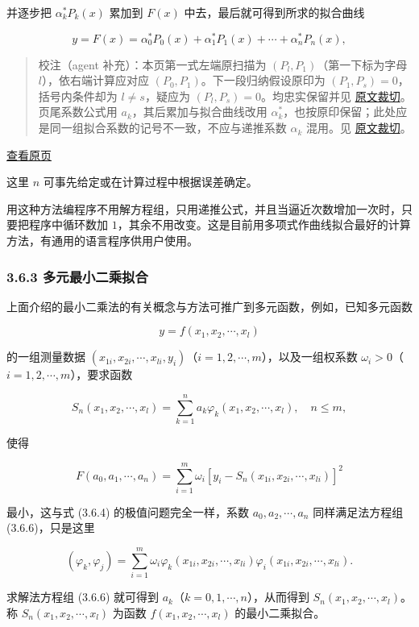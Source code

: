 \documentclass[
  10pt,
  fontset=fandol]{ctexart}
\begin{document}
并逐步把 \(\alpha_k^*P_k(x)\) 累加到 \(F(x)\) 中去，最后就可得到所求的拟合曲线

\[
y=F(x)=\alpha_0^*P_0(x)+\alpha_1^*P_1(x)+\cdots+\alpha_n^*P_n(x),
\]

\begin{quote}
校注（agent 补充）：本页第一式左端原扫描为 \((P_l,P_1)\)（第一下标为字母 \(l\)），依右端计算应对应 \((P_0,P_1)\)。下一段归纳假设原印为 \((P_1,P_s)=0\)，括号内条件却为 \(l\ne s\)，疑应为 \((P_l,P_s)=0\)。均忠实保留并见 \href{../assets/ch03b/p083-induction-start.png}{原文裁切}。页尾系数公式用 \(a_k\)，其后累加与拟合曲线改用 \(\alpha_k^*\)，也按原印保留；此处应是同一组拟合系数的记号不一致，不应与递推系数 \(\alpha_k\) 混用。见 \href{../assets/ch03b/p083-fit-coefficients.png}{原文裁切}。
\end{quote}

\href{../../source-images/pdf-084.jpeg}{查看原页}

这里 \(n\) 可事先给定或在计算过程中根据误差确定。

用这种方法编程序不用解方程组，只用递推公式，并且当逼近次数增加一次时，只要把程序中循环数加 \(1\)，其余不用改变。这是目前用多项式作曲线拟合最好的计算方法，有通用的语言程序供用户使用。

\subsubsection{3.6.3 多元最小二乘拟合}\label{ux591aux5143ux6700ux5c0fux4e8cux4e58ux62dfux5408}

上面介绍的最小二乘法的有关概念与方法可推广到多元函数，例如，已知多元函数

\[
y=f(x_1,x_2,\cdots,x_l)
\]

的一组测量数据 \((x_{1i},x_{2i},\cdots,x_{li},y_i)\)（\(i=1,2,\cdots,m\)），以及一组权系数 \(\omega_i>0\)（\(i=1,2,\cdots,m\)），要求函数

\[
S_n(x_1,x_2,\cdots,x_l)=\sum_{k=1}^na_k\varphi_k(x_1,x_2,\cdots,x_l),\quad n\leqslant m,
\]

使得

\[
F(a_0,a_1,\cdots,a_n)=\sum_{i=1}^m\omega_i[y_i-S_n(x_{1i},x_{2i},\cdots,x_{li})]^2
\]

最小，这与式 (3.6.4) 的极值问题完全一样，系数 \(a_0,a_2,\cdots,a_n\) 同样满足法方程组 (3.6.6)，只是这里

\[
(\varphi_k,\varphi_j)=\sum_{i=1}^m\omega_i\varphi_k(x_{1i},x_{2i},\cdots,x_{li})\varphi_i(x_{1i},x_{2i},\cdots,x_{li}).
\]

求解法方程组 (3.6.6) 就可得到 \(a_k\)（\(k=0,1,\cdots,n\)），从而得到 \(S_n(x_1,x_2,\cdots,x_l)\)。称 \(S_n(x_1,x_2,\cdots,x_l)\) 为函数 \(f(x_1,x_2,\cdots,x_l)\) 的最小二乘拟合。
\end{document}
